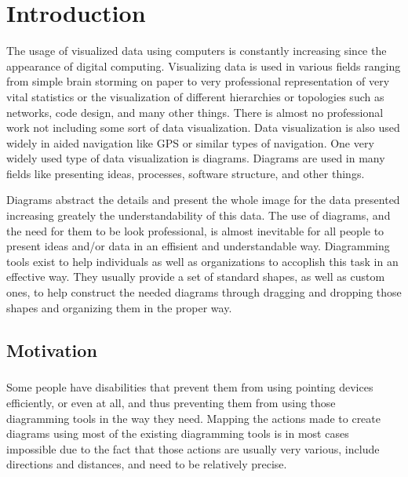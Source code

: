 \chapter{Introduction}
\beginchapter

The usage of visualized data using computers is constantly increasing since the appearance of digital computing. Visualizing data is used in various fields ranging from simple brain storming on paper to very professional representation of very vital statistics or the visualization of different hierarchies or topologies such as networks, code design, and many other things. There is almost no professional work not including some sort of data visualization.
Data visualization is also used widely in aided navigation like GPS or similar types of navigation.
One very widely used type of data visualization is diagrams. Diagrams are used in many fields like presenting ideas, processes, software structure, and other things. 

Diagrams abstract the details and present the whole image for the data presented increasing greately the understandability of this data. The use of diagrams, and the need for them to be look professional, is almost inevitable for all people to present ideas and/or data in an effisient and understandable way. Diagramming tools exist to help individuals as well as organizations to accoplish this task in an effective way. They usually provide a set of standard shapes, as well as custom ones, to help construct the needed diagrams through dragging and dropping those shapes and organizing them in the proper way.

\section{Motivation}
\paragraph{}
Some people have disabilities that prevent them from using pointing devices efficiently, or even at all, and thus preventing them from using those diagramming tools in the way they need. Mapping the actions made to create diagrams using most of the existing diagramming tools is in most cases impossible due to the fact that those actions are usually very various, include directions and distances, and need to be relatively precise.

